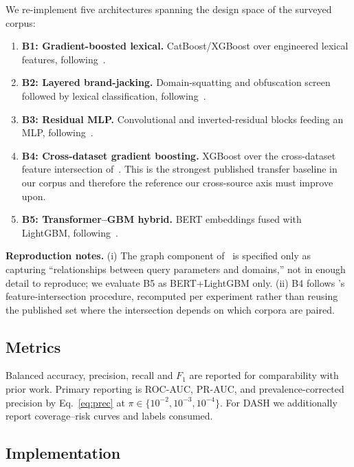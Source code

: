 \documentclass[conference]{IEEEtran}
\begin{document}
We re-implement five architectures spanning the design space of the surveyed
corpus:

\begin{enumerate}
\item \textbf{B1: Gradient-boosted lexical.} CatBoost/XGBoost over
      engineered lexical features, following~\cite{kustiawan2025feateng,
      kustiawan2025phishofe}.
\item \textbf{B2: Layered brand-jacking.} Domain-squatting and obfuscation
      screen followed by lexical classification,
      following~\cite{goenka2025layered}.
\item \textbf{B3: Residual MLP.} Convolutional and inverted-residual blocks
      feeding an MLP, following~\cite{remya2024resmlp}.
\item \textbf{B4: Cross-dataset gradient boosting.} XGBoost over the
      cross-dataset feature intersection of~\cite{misiek2026xgboost}. This is the
      strongest published transfer baseline in our corpus and therefore the
      reference our cross-source axis must improve upon.
\item \textbf{B5: Transformer--GBM hybrid.} BERT embeddings fused with
      LightGBM, following~\cite{remya2025bgl}.
\end{enumerate}

\textbf{Reproduction notes.} (i) The graph component
of~\cite{remya2025bgl} is specified only as capturing ``relationships
between query parameters and domains,'' not in enough detail to
reproduce; we evaluate B5 as BERT+LightGBM only. (ii) B4 follows
\cite{misiek2026xgboost}'s feature-intersection procedure, recomputed per
experiment rather than reusing the published set where the intersection
depends on which corpora are paired.

\subsection{Metrics}

Balanced accuracy, precision, recall and $F_1$ are reported for comparability
with prior work. Primary reporting is ROC-AUC, PR-AUC, and
prevalence-corrected precision by Eq.~\eqref{eq:prec} at
$\pi \in \{10^{-2},10^{-3},10^{-4}\}$. For DASH we additionally report
coverage--risk curves and labels consumed.

\subsection{Implementation}
\label{sec:implementation}
\end{document}
